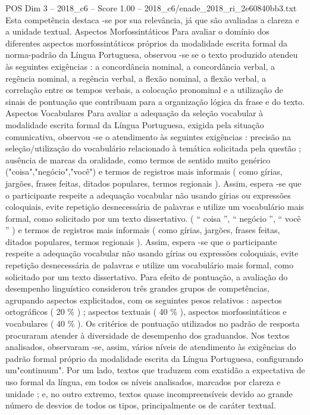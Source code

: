 \begin{textsample}{POS Dim 3 – 2018\_c6 – Score 1.00 – 2018\_c6/enade\_2018\_ri\_2e60840bb3.txt}
Esta competência destaca -se por sua relevância, já que são avaliadas a clareza e a unidade textual.
Aspectos Morfossintáticos Para avaliar o domínio dos diferentes aspectos morfossintáticos próprios da modalidade escrita formal da norma-padrão da Língua Portuguesa, observou -se se o texto produzido atendeu às seguintes exigências : a concordância nominal, a concordância verbal, a regência nominal, a regência verbal, a flexão nominal, a flexão verbal, a correlação entre os tempos verbais, a colocação pronominal e a utilização de sinais de pontuação que contribuam para a organização lógica da frase e do texto.
Aspectos Vocabulares Para avaliar a adequação da seleção vocabular à modalidade escrita formal da Língua Portuguesa, exigida pela situação comunicativa, observou -se o atendimento às seguintes exigências : precisão na seleção/utilização do vocabulário relacionado à temática solicitada pela questão ; ausência de marcas da oralidade, como termos de sentido muito genérico ("coisa","negócio","você") e termos de registros mais informais ( como gírias, jargões, frases feitas, ditados populares, termos regionais ).
Assim, espera -se que o participante respeite a adequação vocabular não usando gírias ou expressões coloquiais, evite repetição desnecessária de palavras e utilize um vocabulário mais formal, como solicitado por um texto dissertativo. ( “ coisa ”, “ negócio ”, “ você ” ) e termos de registros mais informais ( como gírias, jargões, frases feitas, ditados populares, termos regionais ).
Assim, espera -se que o participante respeite a adequação vocabular não usando gírias ou expressões coloquiais, evite repetição desnecessária de palavras e utilize um vocabulário mais formal, como solicitado por um texto dissertativo.
Para efeito de pontuação, a avaliação do desempenho linguístico considerou três grandes grupos de competências, agrupando aspectos explicitados, com os seguintes pesos relativos : aspectos ortográficos ( 20 \% ) ; aspectos textuais ( 40 \% ), aspectos morfossintáticos e vocabulares ( 40 \% ).
Os critérios de pontuação utilizados no padrão de resposta procuraram atender à diversidade de desempenho dos graduandos.
Nos textos analisados, observaram -se, assim, vários níveis de atendimento às exigências do padrão formal próprio da modalidade escrita da Língua Portuguesa, configurando um"continuum".
Por um lado, textos que traduzem com exatidão a expectativa de uso formal da língua, em todos os níveis analisados, marcados por clareza e unidade ; e, no outro extremo, textos quase incompreensíveis devido ao grande número de desvios de todos os tipos, principalmente os de caráter textual.

\end{textsample}
